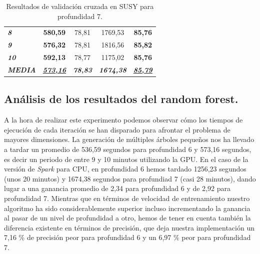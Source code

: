 \begin{table}[ht]
\begin{tabular}{@{}l|cc|cc|@{}}
\textit{\textbf{8}}          & \textbf{580,59}                                  & 78,81                                                 & 1769,53                                          & \textbf{85,76}                                        \\
\textit{\textbf{9}}          & \textbf{576,32}                                  & 78,81                                                 & 1816,56                                          & \textbf{85,82}                                        \\
\textit{\textbf{10}}         & \textbf{592,13}                                  & 78,77                                                 & 1175,02                                          & \textbf{85,76}                                        \\ \midrule
\textit{\textbf{MEDIA}}      & {\ul \textit{\textbf{573,16}}}                   & \textit{\textbf{78,83}}                               & \textit{\textbf{1674,38}}                        & {\ul \textit{\textbf{85,79}}}                         \\ \bottomrule
\end{tabular}
\caption{Resultados de validación cruzada en SUSY para profundidad 7.}
\label{tab:susyprof7}
\end{table}

\newpage
\subsection{Análisis de los resultados del random forest.}
A la hora de realizar este experimento podemos observar cómo los tiempos de ejecución de cada iteración se han disparado para afrontar el problema de mayores dimensiones. La generación de múltiples árboles pequeños nos ha llevado a tardar un promedio de 536,59 segundos para profundidad 6 y 573,16 segundos, es decir un periodo de entre 9 y 10 minutos utilizando la GPU. En el caso de la versión de \textit{Spark} para CPU, en profundidad 6 hemos tardado 1256,23 segundos (unos 20 minutos) y 1674,38 segundos para profundiad 7 (casi 28 minutos), dando lugar a una ganancia promedio de 2,34 para profundidad 6 y de 2,92 para profundidad 7. Mientras que en términos de velocidad de entrenamiento nuestro algoritmo ha sido considerablemente superior incluso incrementando la ganancia al pasar de un nivel de profundidad a otro, hemos de tener en cuenta también la diferencia existente en términos de precisión, que deja nuestra implementación un 7,16 \% de precisión peor para profundidad 6 y un 6,97 \% peor para profundidad 7.\\

